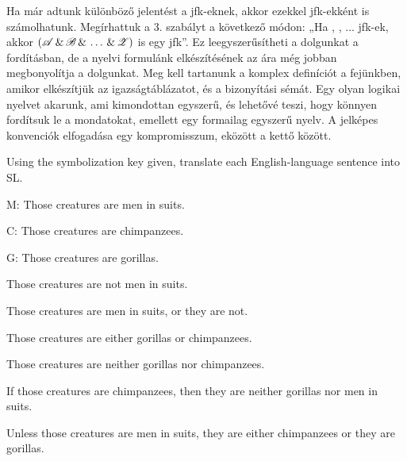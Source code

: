 Ha már adtunk különböző jelentést a jfk-eknek, akkor ezekkel jfk-ekként is számolhatunk. Megírhattuk a 3. szabályt a következő módon: „Ha , , $\ldots$  jfk-ek, akkor $(\mathscr{A}\,\&\,\mathscr{B}\,\&\,\ldots\,\&\,\mathscr{Z})$ is egy jfk”. Ez leegyszerűsítheti a dolgunkat a fordításban, de a nyelvi formulánk elkészítésének az ára még jobban megbonyolítja a dolgunkat. Meg kell tartanunk a komplex definíciót a fejünkben, amikor elkészítjük az igazságtáblázatot, és a bizonyítási sémát. Egy olyan logikai nyelvet akarunk, ami kimondottan egyszerű, és lehetővé teszi, hogy könnyen fordítsuk le a mondatokat, emellett egy formailag egyszerű nyelv. A jelképes konvenciók elfogadása egy kompromisszum, eközött a kettő között.

\practiceproblems

\solutions
\problempart Using the symbolization key given, translate each English-language sentence into SL.
\label{pr.monkeysuits}
\begin{ekey}
\item[M:] Those creatures are men in suits. 
\item[C:] Those creatures are chimpanzees. 
\item[G:] Those creatures are gorillas.
\end{ekey}
\begin{earg}
\item Those creatures are not men in suits.
\item Those creatures are men in suits, or they are not.
\item Those creatures are either gorillas or chimpanzees.
\item Those creatures are neither gorillas nor chimpanzees.
\item If those creatures are chimpanzees, then they are neither gorillas nor men in suits.
\item Unless those creatures are men in suits, they are either chimpanzees or they are gorillas.
\end{earg}

